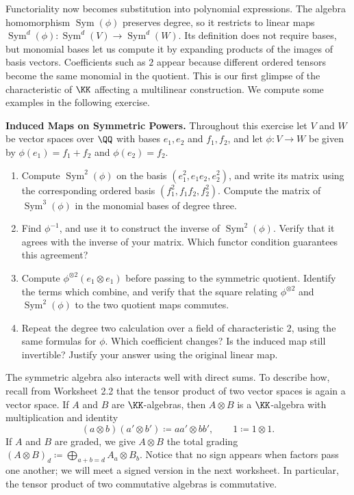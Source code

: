 \documentclass[12pt,reqno]{amsart}
\DeclareMathOperator{\Sym}{Sym}
\begin{document}
\hrulefill

Functoriality now becomes substitution into polynomial expressions. The algebra homomorphism $\Sym(\phi)$ preserves degree, so it restricts to linear maps $\Sym^d(\phi):\Sym^d(V)\to\Sym^d(W)$. Its definition does not require bases, but monomial bases let us compute it by expanding products of the images of basis vectors. Coefficients such as $2$ appear because different ordered tensors become the same monomial in the quotient. This is our first glimpse of the characteristic of $\KK$ affecting a multilinear construction. We compute some examples in the following exercise.

\hrulefill

\begin{problems}
\item\label{s:computation} \textbf{Induced Maps on Symmetric Powers.} Throughout this exercise let $V$ and $W$ be vector spaces over $\QQ$ with bases $e_1,e_2$ and $f_1,f_2$, and let $\phi:V\to W$ be given by $\phi(e_1)=f_1+f_2$ and $\phi(e_2)=f_2$.
\begin{enumerate}
\item Compute $\Sym^2(\phi)$ on the basis $(e_1^2,e_1e_2,e_2^2)$, and write its matrix using the corresponding ordered basis $(f_1^2,f_1f_2,f_2^2)$. Compute the matrix of $\Sym^3(\phi)$ in the monomial bases of degree three.
\item Find $\phi^{-1}$, and use it to construct the inverse of $\Sym^2(\phi)$. Verify that it agrees with the inverse of your matrix. Which functor condition guarantees this agreement?
\item Compute $\phi^{\otimes2}(e_1\otimes e_1)$ before passing to the symmetric quotient. Identify the terms which combine, and verify that the square relating $\phi^{\otimes2}$ and $\Sym^2(\phi)$ to the two quotient maps commutes.
\item Repeat the degree two calculation over a field of characteristic $2$, using the same formulas for $\phi$. Which coefficient changes? Is the induced map still invertible? Justify your answer using the original linear map.
\end{enumerate}
\end{problems}

\hrulefill

The symmetric algebra also interacts well with direct sums. To describe how, recall from Worksheet 2.2 that the tensor product of two vector spaces is again a vector space. If $A$ and $B$ are $\KK$-algebras, then $A\otimes B$ is a $\KK$-algebra with multiplication and identity
\[
(a\otimes b)(a'\otimes b')\coloneqq aa'\otimes bb',\qquad 1\coloneqq1\otimes1.
\]
If $A$ and $B$ are graded, we give $A\otimes B$ the total grading $(A\otimes B)_d\coloneqq\bigoplus_{a+b=d}A_a\otimes B_b$. Notice that no sign appears when factors pass one another; we will meet a signed version in the next worksheet. In particular, the tensor product of two commutative algebras is commutative.
\end{document}
